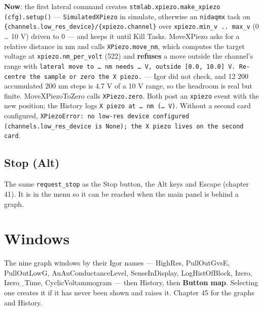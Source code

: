 \textbf{Now}: the first lateral command creates \texttt{stmlab.\discretionary{}{}{}xpiezo.\discretionary{}{}{}make\_\discretionary{}{}{}xpiezo (cfg).\discretionary{}{}{}setup()} --- \texttt{Simulated\discretionary{}{}{}XPiezo} in simulate, otherwise an \texttt{nidaqmx} task on \texttt{\{channels.\discretionary{}{}{}low\_\discretionary{}{}{}res\_\discretionary{}{}{}device\}/\discretionary{}{}{}\{xpiezo.\discretionary{}{}{}channel\}} over \texttt{xpiezo.\discretionary{}{}{}min\_\discretionary{}{}{}v .\discretionary{}{}{}.\discretionary{}{}{} max\_\discretionary{}{}{}v} (0 \ldots{} 10 V) driven to 0 --- and keeps it until Kill Tasks. MoveXPiezo asks for a relative distance in nm and calls \texttt{XPiezo.\discretionary{}{}{}move\_\discretionary{}{}{}nm}, which computes the target voltage at \texttt{xpiezo.\discretionary{}{}{}nm\_\discretionary{}{}{}per\_\discretionary{}{}{}volt} (522) and \textbf{refuses} a move outside the channel's range with \texttt{lateral move to … nm needs … V,\discretionary{}{}{} outside [0.\discretionary{}{}{}0,\discretionary{}{}{} 10.\discretionary{}{}{}0] V.\discretionary{}{}{} Re-centre the sample or zero the X piezo.\discretionary{}{}{}} --- Igor did not check, and 12 200 accumulated 200 nm steps is 4.7 V of a 10 V range, so the headroom is real but finite. MoveXPiezoToZero calls \texttt{XPiezo.\discretionary{}{}{}zero}. Both post an \texttt{xpiezo} event with the new position; the History logs \texttt{X piezo at … nm (… V)}. Without a second card configured, \texttt{XPiezo\discretionary{}{}{}Error: no low-res device configured (channels.\discretionary{}{}{}low\_\discretionary{}{}{}res\_\discretionary{}{}{}device is None); the X piezo lives on the second card}.

\subsection{Stop (Alt)}

The same \texttt{request\_\discretionary{}{}{}stop} as the Stop button, the Alt keys and Escape (chapter 41). It is in the menu so it can be reached when the main panel is behind a graph.

\section{Windows}

The nine graph windows by their Igor names --- HighRes, PullOutGvsE, PullOutLowG, AuAuConductanceLevel, SenseInDisplay, LogHistOfBlock, Izero, Izero\_Time, CyclicVoltammogram --- then History, then \textbf{Button map}. Selecting one creates it if it has never been shown and raises it. Chapter 45 for the graphs and History.

